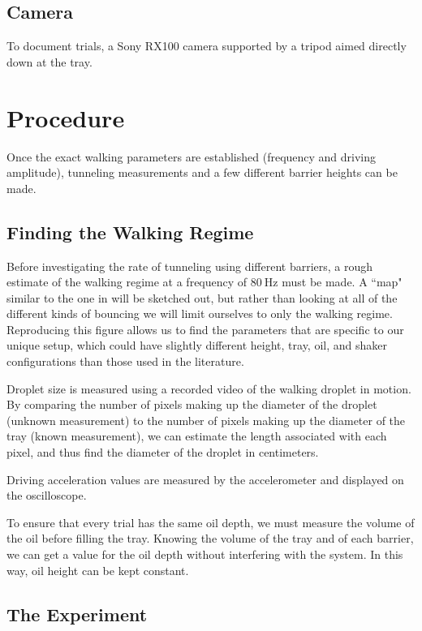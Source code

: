 \subsection{Camera}       
 
To document trials, a Sony RX100 camera supported by a tripod aimed directly down at the tray. 

\section{Procedure}
Once the exact walking parameters are established (frequency and driving amplitude), tunneling measurements and a few different barrier heights can be made. 

\subsection{Finding the Walking Regime}

Before investigating the rate of tunneling using different barriers, a rough estimate of the walking regime at a frequency of $80~\mathrm{Hz}$ must be made. A ``map" similar to the one in  will be sketched out, but rather than looking at all of the different kinds of bouncing we will limit ourselves to only the walking regime. Reproducing this figure allows us to find the parameters that are specific to our unique setup, which could have slightly different height, tray, oil, and shaker configurations than those used in the literature. 

Droplet size is measured using a recorded video of the walking droplet in motion. By comparing the number of pixels making up the diameter of the droplet (unknown measurement) to the number of pixels making up the diameter of the tray (known measurement), we can estimate the length associated with  each pixel, and thus find the diameter of the droplet in centimeters. 

Driving acceleration values are measured by the accelerometer and displayed on the oscilloscope. 

To ensure that every trial has the same oil depth, we must measure the volume of the oil before filling the tray. Knowing the volume of the tray and of each barrier, we can get a value for the oil depth without interfering with the system. In this way, oil height can be kept constant.

\subsection{The Experiment}

